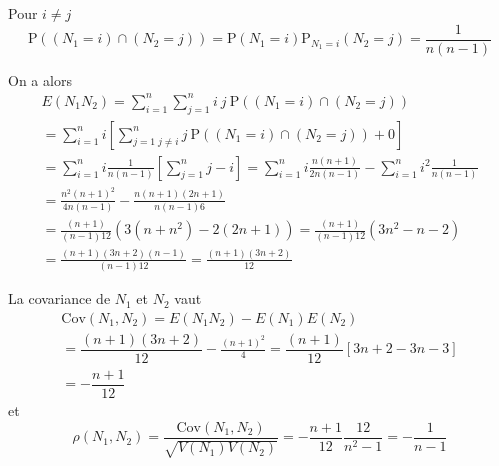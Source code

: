 \begin{enumerate}
\begin{enumerate}
Pour  $i\neq j$
$$\mathrm{P}\left(( N_{1}=i)\cap (N_{2}=j)\right) =\mathrm{P}\left(
N_{1}=i\right) \mathrm{P}_{N_{1}=i}\left( N_{2}=j\right) =\frac{1}{n\left(
n-1\right) }$$

On a alors 
\begin{multline*}
E\left( N_{1}N_{2}\right) 
 = \sum_{i=1}^{n}\sum_{j=1}^{n}i~j~\mathrm{P}\left( (N_{1}=i)\cap (N_{2}=j)\right) \\
 = \sum_{i=1}^{n}i\left[ \sum_{j=1\; j\neq i}^{n}j~\mathrm{P}\left((N_{1}=i)\cap (N_{2}=j)\right) +0\right] \\
 = \sum_{i=1}^{n}i\frac{1}{n\left( n-1\right) }\left[ \sum_{j=1}^{n}j-i\right] 
 = \sum_{i=1}^{n}i\frac{n\left( n+1\right) }{2n\left( n-1\right) } -\sum_{i=1}^{n}i^{2}\frac{1}{n\left( n-1\right) } \\
 = \frac{n^{2}\left( n+1\right) ^{2}}{4n\left( n-1\right) }-\frac{n\left( n+1\right) \left( 2n+1\right) }{n\left( n-1\right) 6} \\
 = \frac{\left( n+1\right) }{\left( n-1\right) 12}\left( 3\left( n+n^{2}\right) -2\left( 2n+1\right) \right) 
 = \frac{\left( n+1\right) }{\left( n-1\right) 12}\left( 3n^{2}-n-2\right) \\
 = \frac{\left( n+1\right) \left( 3n+2\right) \left( n-1\right) }{\left(n-1\right) 12}
 = \frac{\left( n+1\right) \left( 3n+2\right)  }{ 12}
\end{multline*}


La covariance de $N_{1}$ et $N_{2}$ vaut 
\begin{multline*}
\mathrm{Cov}\left( N_{1},N_{2}\right)
 = E\left( N_{1}N_{2}\right) -E\left(N_{1}\right) E\left( N_{2}\right) \\
 = \dfrac{\left( n+1\right) \left( 3n+2\right) }{12}-\frac{\left( n+1\right)^{2}}{4} 
 = \dfrac{\left( n+1\right) }{12}\left[ 3n+2-3n-3\right] \\
 = -\dfrac{n+1}{12}
\end{multline*}%
 et
\begin{displaymath} 
\rho \left( N_{1},N_{2}\right) 
 = \frac{\mathrm{Cov}\left(N_{1},N_{2}\right) }{\sqrt{V\left( N_{1}\right) V\left( N_{2}\right) }} 
 = -\dfrac{n+1}{12}\frac{12}{n^{2}-1} 
 = -\frac{1}{n-1}
\end{displaymath}




\end{enumerate}
\end{enumerate}
